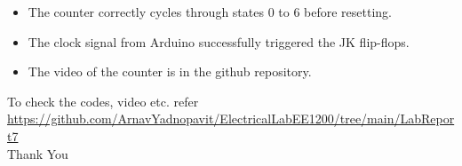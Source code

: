 \documentclass[12pt,a4paper]{article}
\begin{document}
\begin{itemize}
    \item The counter correctly cycles through states 0 to 6 before resetting.
    \item The clock signal from Arduino successfully triggered the JK flip-flops.
    \item The video of the counter is in the github repository.
\end{itemize}
To check the codes, video etc. refer \url{https://github.com/ArnavYadnopavit/ElectricalLabEE1200/tree/main/LabReport7}\\

\centering
Thank You
\end{document}
